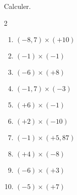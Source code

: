 \begin{exercice*}
    Calculer.
    \begin{multicols}2
        \begin{enumerate}
            \item $ (-8,7) \times  (+10) $
            \item $ (-1) \times  (-1) $
            \item $ (-6) \times  (+8) $
            \item $ (-1,7) \times  (-3) $
            \item $ (+6) \times  (-1) $
            \item $ (+2) \times  (-10) $
            \item $ (-1) \times  (+5,87) $
            \item $ (+4) \times  (-8) $
            \item $ (-6) \times  (+3) $
            \item $ (-5) \times  (+7) $            
        \end{enumerate}
    \end{multicols}

\end{exercice*}
